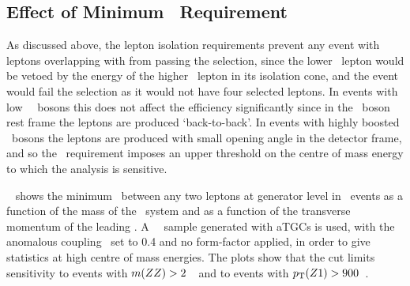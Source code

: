 \subsection{Effect of Minimum \deltaR\ Requirement}

As discussed above, the lepton isolation requirements prevent any event with
leptons overlapping with  from passing
the selection, since the lower \pt\ lepton would be vetoed by the
energy of the higher \pt\ lepton in its isolation cone, and the event would fail
the selection as it would not have four selected leptons. In events with low
\pt\ \Z\ bosons this does not affect the efficiency significantly since in the
\Z\ boson rest frame the leptons are produced `back-to-back'. In events with
highly boosted \Z\ bosons the leptons are produced with small opening angle in
the detector frame, and so the \deltaR\ requirement imposes an upper threshold on the centre of mass energy to
which the analysis is sensitive.

~ shows the minimum \deltaR\ between any two leptons
at generator level in \fourlep\ events as a function of the
mass of the \fourlep\ system and as a function of the transverse momentum of the
leading \Z. A \ZZllll\ \mc\ sample generated with aTGCs is used, with the
anomalous coupling \ffourg\ set to 0.4
and no form-factor applied, in order to give statistics at high centre of mass
energies. The plots show that the  cut limits sensitivity to
events with $m(ZZ)>2$~\tev\ and to events with $p_{\mathrm{T}}(Z1)>900$~\gev.


